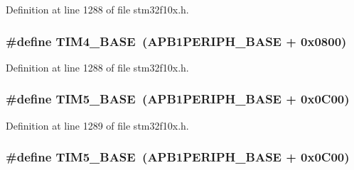 Definition at line 1288 of file stm32f10x.\+h.

\subsubsection[{\texorpdfstring{T\+I\+M4\+\_\+\+B\+A\+SE}{TIM4_BASE}}]{\setlength{\rightskip}{0pt plus 5cm}\#define T\+I\+M4\+\_\+\+B\+A\+SE~({\bf A\+P\+B1\+P\+E\+R\+I\+P\+H\+\_\+\+B\+A\+SE} + 0x0800)}\hypertarget{group___peripheral__memory__map_ga56e2d44b0002f316527b8913866a370d}{}\label{group___peripheral__memory__map_ga56e2d44b0002f316527b8913866a370d}


Definition at line 1288 of file stm32f10x.\+h.

\subsubsection[{\texorpdfstring{T\+I\+M5\+\_\+\+B\+A\+SE}{TIM5_BASE}}]{\setlength{\rightskip}{0pt plus 5cm}\#define T\+I\+M5\+\_\+\+B\+A\+SE~({\bf A\+P\+B1\+P\+E\+R\+I\+P\+H\+\_\+\+B\+A\+SE} + 0x0\+C00)}\hypertarget{group___peripheral__memory__map_ga3e1671477190d065ba7c944558336d7e}{}\label{group___peripheral__memory__map_ga3e1671477190d065ba7c944558336d7e}


Definition at line 1289 of file stm32f10x.\+h.

\subsubsection[{\texorpdfstring{T\+I\+M5\+\_\+\+B\+A\+SE}{TIM5_BASE}}]{\setlength{\rightskip}{0pt plus 5cm}\#define T\+I\+M5\+\_\+\+B\+A\+SE~({\bf A\+P\+B1\+P\+E\+R\+I\+P\+H\+\_\+\+B\+A\+SE} + 0x0\+C00)}\hypertarget{group___peripheral__memory__map_ga3e1671477190d065ba7c944558336d7e}{}\label{group___peripheral__memory__map_ga3e1671477190d065ba7c944558336d7e}


